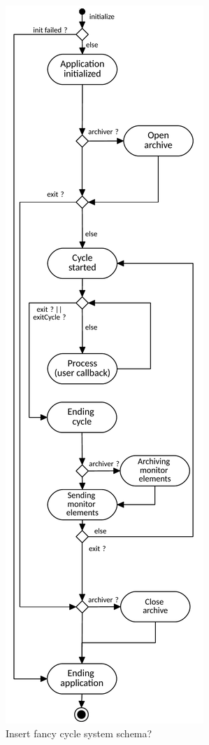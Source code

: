 \documentclass[conference]{IEEEtran}
\begin{document}
\begin{figure}[htbp]
\begin{center}
    \includegraphics[width=0.65\linewidth]{figs/StandaloneModuleApplicatonWorkflowDiagram.pdf}
    \caption{\label{fig:DQMCycleSystem} \color{red}Insert fancy cycle system schema?}
  \end{center}
\end{figure}
\end{document}
